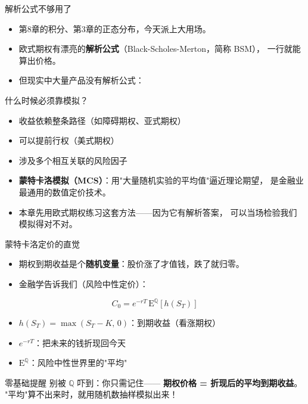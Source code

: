 \documentclass[9pt]{ctexbeamer}
\begin{document}
\begin{frame}{解析公式不够用了}
	\begin{itemize}
		\item 第8章的积分、第3章的正态分布，今天派上大用场。
		\item 欧式期权有漂亮的\textbf{解析公式}（Black-Scholes-Merton，简称 BSM），
			一行就能算出价格。
		\item 但现实中大量产品\alert{没有}解析公式：
	\end{itemize}
	\begin{block}{什么时候必须靠模拟？}
		\begin{itemize}
			\item 收益依赖整条路径（如障碍期权、亚式期权）
			\item 可以提前行权（美式期权）
			\item 涉及多个相互关联的风险因子
		\end{itemize}
	\end{block}
	\begin{itemize}
		\item \textbf{蒙特卡洛模拟（MCS）}：用"大量随机实验的平均值"逼近理论期望，
			是金融业最通用的数值定价技术。
		\item 本章先用欧式期权练习这套方法——因为它有解析答案，
			\alert{可以当场检验我们模拟得对不对}。
	\end{itemize}
\end{frame}

\begin{frame}{蒙特卡洛定价的直觉}
	\begin{itemize}
		\item 期权到期收益是个\textbf{随机变量}：股价涨了才值钱，跌了就归零。
		\item 金融学告诉我们（风险中性定价）：
	\end{itemize}
	\begin{equation*}
		C_0 = e^{-rT}\,\mathrm{E}^{\mathbb{Q}}\!\left[h(S_T)\right]
	\end{equation*}
	\begin{itemize}
		\item $h(S_T)=\max(S_T-K,\,0)$：到期收益（看涨期权）
		\item $e^{-rT}$：把未来的钱折现回今天
		\item $\mathrm{E}^{\mathbb{Q}}$：风险中性世界里的"平均"
	\end{itemize}
	\begin{alertblock}{零基础提醒}
		别被 $\mathbb{Q}$ 吓到：你只需记住——
		\textbf{期权价格 = 折现后的平均到期收益}。
		"平均"算不出来时，就用随机数\alert{抽样模拟}出来！
	\end{alertblock}
\end{frame}
\end{document}
